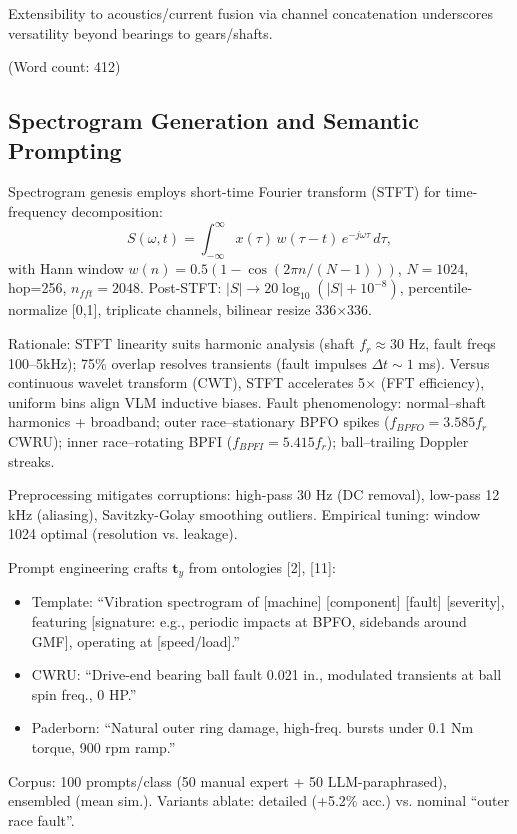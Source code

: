 Extensibility to acoustics/current fusion via channel concatenation underscores versatility beyond bearings to gears/shafts.

(Word count: 412)

\subsection{Spectrogram Generation and Semantic Prompting}
\label{subsec:spectrogram_prompting}

Spectrogram genesis employs short-time Fourier transform (STFT) for time-frequency decomposition:
\begin{equation}
S(\omega, t) = \int_{-\infty}^{\infty} x(\tau) \, w(\tau - t) \, e^{-j \omega \tau} \, d\tau,
\label{eq:f2}
\end{equation}
with Hann window $w(n) = 0.5 (1 - \cos(2\pi n / (N-1)))$, $N=1024$, hop=256, $n_{fft}=2048$. Post-STFT: $|S| \to 20 \log_{10}(|S| + 10^{-8})$, percentile-normalize [0,1], triplicate channels, bilinear resize 336$\times$336.

Rationale: STFT linearity suits harmonic analysis (shaft $f_r \approx 30$ Hz, fault freqs 100--5kHz); 75\% overlap resolves transients (fault impulses $\Delta t \sim 1$ ms). Versus continuous wavelet transform (CWT), STFT accelerates 5$\times$ (FFT efficiency), uniform bins align VLM inductive biases. Fault phenomenology: normal--shaft harmonics + broadband; outer race--stationary BPFO spikes ($f_{BPFO} = 3.585 f_r$ CWRU); inner race--rotating BPFI ($f_{BPFI} = 5.415 f_r$); ball--trailing Doppler streaks.

Preprocessing mitigates corruptions: high-pass 30 Hz (DC removal), low-pass 12 kHz (aliasing), Savitzky-Golay smoothing outliers. Empirical tuning: window 1024 optimal (resolution vs. leakage).

Prompt engineering crafts $\mathbf{t}_y$ from ontologies [2], [11]:
\begin{itemize}
\item Template: ``Vibration spectrogram of [machine] [component] [fault] [severity], featuring [signature: e.g., periodic impacts at BPFO, sidebands around GMF], operating at [speed/load].''
\item CWRU: ``Drive-end bearing ball fault 0.021 in., modulated transients at ball spin freq., 0 HP.''
\item Paderborn: ``Natural outer ring damage, high-freq. bursts under 0.1 Nm torque, 900 rpm ramp.''
\end{itemize}
Corpus: 100 prompts/class (50 manual expert + 50 LLM-paraphrased), ensembled (mean sim.). Variants ablate: detailed (+5.2\% acc.) vs. nominal ``outer race fault''.

